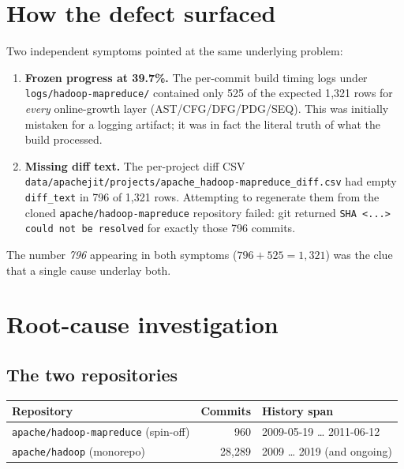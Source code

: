 \documentclass[11pt]{article}
\newcommand{\code}[1]{\texttt{#1}}
\begin{document}
\section{How the defect surfaced}
Two independent symptoms pointed at the same underlying problem:

\begin{enumerate}
  \item \textbf{Frozen progress at 39.7\%.} The per-commit build timing logs
  under \code{logs/hadoop-mapreduce/} contained only 525 of the expected 1{,}321
  rows for \emph{every} online-growth layer (AST/CFG/DFG/PDG/SEQ). This was
  initially mistaken for a logging artifact; it was in fact the literal truth of
  what the build processed.

  \item \textbf{Missing diff text.} The per-project diff CSV
  \code{data/apachejit/projects/apache\_hadoop-mapreduce\_diff.csv} had empty
  \code{diff\_text} in 796 of 1{,}321 rows. Attempting to regenerate them from
  the cloned \code{apache/hadoop-mapreduce} repository failed: git returned
  \code{SHA <...> could not be resolved} for exactly those 796 commits.
\end{enumerate}

The number \emph{796} appearing in both symptoms ($796 + 525 = 1{,}321$) was the
clue that a single cause underlay both.

\section{Root-cause investigation}

\subsection{The two repositories}
\begin{center}
\begin{tabular}{@{}lrl@{}}
\toprule
Repository & Commits & History span \\
\midrule
\code{apache/hadoop-mapreduce} (spin-off) & 960     & 2009-05-19 \ldots{} 2011-06-12 \\
\code{apache/hadoop} (monorepo)           & 28{,}289 & 2009 \ldots{} 2019 (and ongoing) \\
\bottomrule
\end{tabular}
\end{center}
\end{document}
